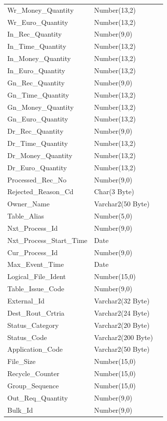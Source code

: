 \documentclass[12pt,twoside]{article}
\begin{document}
\begin{longtable}{l|l|l}
Wr\_Money\_Quantity & Number(13,2) & \\
Wr\_Euro\_Quantity & Number(13,2) & \\
In\_Rec\_Quantity & Number(9,0) & \\
In\_Time\_Quantity & Number(13,2) & \\
In\_Money\_Quantity & Number(13,2) & \\
In\_Euro\_Quantity & Number(13,2) & \\
Gn\_Rec\_Quantity & Number(9,0) & \\
Gn\_Time\_Quantity & Number(13,2) & \\
Gn\_Money\_Quantity & Number(13,2) & \\
Gn\_Euro\_Quantity & Number(13,2) & \\
Dr\_Rec\_Quantity & Number(9,0) & \\
Dr\_Time\_Quantity & Number(13,2) & \\
Dr\_Money\_Quantity & Number(13,2) & \\
Dr\_Euro\_Quantity & Number(13,2) & \\
Processed\_Rec\_No & Number(9,0) & \\
Rejected\_Reason\_Cd & Char(3 Byte) & \\
Owner\_Name & Varchar2(50 Byte) & \\
Table\_Alias & Number(5,0) & \\
Nxt\_Process\_Id & Number(9,0) & \\
Nxt\_Process\_Start\_Time & Date & \\
Cur\_Process\_Id & Number(9,0) & \\
Max\_Event\_Time & Date & \\
Logical\_File\_Ident & Number(15,0) & \\
Table\_Issue\_Code & Number(9,0) & \\
External\_Id & Varchar2(32 Byte) & \\
Dest\_Rout\_Crtria & Varchar2(24 Byte) & \\
Status\_Category & Varchar2(20 Byte) & \\
Status\_Code & Varchar2(200 Byte) & \\
Application\_Code & Varchar2(50 Byte) & \\
File\_Size & Number(15,0) & \\
Recycle\_Counter & Number(15,0) & \\
Group\_Sequence & Number(15,0) & \\
Out\_Req\_Quantity & Number(9,0) & \\
Bulk\_Id & Number(9,0) & \\

\end{longtable}
\end{document}
